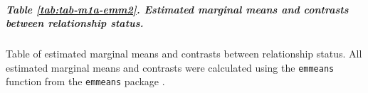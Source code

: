 \documentclass[
  bookmarksnumbered]{article}
\begin{document}
\begin{table}[H]
\centering
\caption{\label{tab:tab-m1a-emm1}Estimated marginal means and contrasts between participants' gender}
\centering
{}
\end{table}

\subparagraph{Table \ref{tab:tab-m1a-emm2}. Estimated marginal means and contrasts between relationship status.}\label{table-reftabtab-m1a-emm2.-estimated-marginal-means-and-contrasts-between-relationship-status.}

Table of estimated marginal means and contrasts between relationship status. All estimated marginal means and contrasts were calculated using the \texttt{emmeans} function from the \texttt{emmeans} package \autocite{emmeanscit}.
\end{document}
